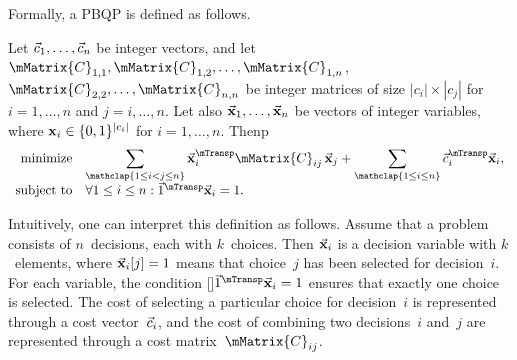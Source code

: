 Formally, a \gls{PBQP} is defined as follows.
%
\begin{definition}[PBQP]
  Let \mbox{$\vec{c}_1, \ldots, \vec{c}_n$} be integer vectors, and let
  \mbox{$\mMatrix{C}_{1,1}, \mMatrix{C}_{1,2}, \ldots, \mMatrix{C}_{1,n}$},
  \mbox{$\mMatrix{C}_{2,2}, \ldots, \mMatrix{C}_{n,n}$}
  be integer matrices of size \mbox{$|c_i| \times |c_j|$} for \mbox{$i = 1,
    \ldots, n$} and \mbox{$j = i, \ldots, n$}\hspace{-.8pt}.
  Let also \mbox{$\mVector{\mVar{x}}_1, \ldots, \mVector{\mVar{x}}_n$} be
  vectors of integer \glspl{variable}, where \mbox{$\mVar{x}_i \in \mSet{0,
      1}^{|c_i|}$} for \mbox{$i = 1, \ldots, n$}\hspace{-.8pt}.
  Thenp
  \begin{displaymath}
    \begin{array}{rl}
      \text{minimize}
        & \displaystyle
          \sum_{\mathclap{1 \leq i < j \leq n}}
          \mVector{\mVar{x}}_i^{\mTransp} \mMatrix{C}_{ij} \, \mVector{\mVar{x}}_j +
          \sum_{\mathclap{1 \leq i \leq n}}
          \mVector{c}_i^{\mTransp} \mVector{\mVar{x}}_i, \\
      \text{subject to}
        & \forall 1 \leq i \leq n :
          \mVector{1}^{\mTransp} \mVector{\mVar{x}}_i = 1. \\
    \end{array}
  \end{displaymath}
\end{definition}

Intuitively, one can interpret this definition as follows.
%
Assume that a problem consists of $n$~decisions, each with $k$~choices.
%
Then $\mVector{\mVar{x}}_i$ is a \gls{decision variable} with $k$~elements,
where \mbox{$\mVector{\mVar{x}}_i[j] = 1$} means that choice~$j$ has been
selected for decision~$i$\hspace{-.8pt}.
%
For each \gls{variable}, the condition
\raisebox{0pt}[\height-2pt]{$\mVector{1}^{\mTransp} \mVector{\mVar{x}}_i = 1$}
ensures that exactly one choice is selected.
%
The cost of selecting a particular choice for decision~$i$ is represented
through a cost vector~$\vec{c}_i$, and the cost of combining two
decisions~$i$ and~$j$ are represented through a cost matrix~$\mMatrix{C}_{ij}$.

